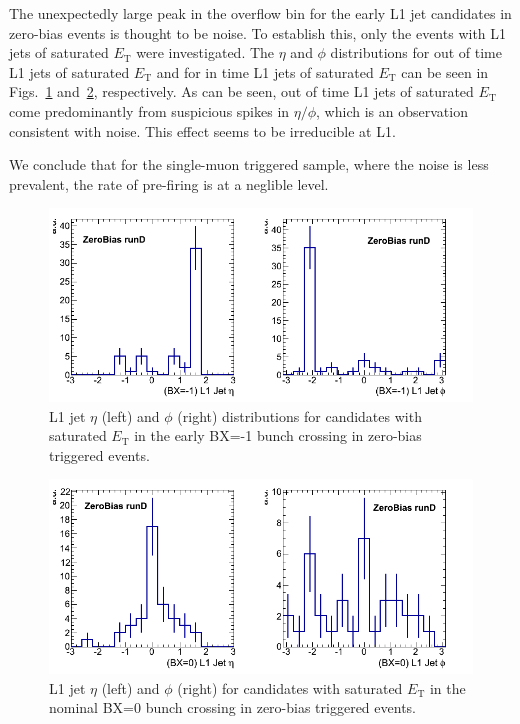 \documentclass[11pt]{cmspaperpdf}
\newcommand{\et}{\ensuremath{E_{\textrm{T}}}\xspace}
\begin{document}
The unexpectedly large peak in the overflow bin for the early L1 jet candidates in zero-bias events is thought to be noise. To establish this, only the events with L1 jets of saturated \et were investigated. The $\eta$ and $\phi$ distributions for out of time L1 jets of saturated \et and for in time L1 jets of saturated \et can be seen in Figs.~\ref{fig:early_eta_phi} and~\ref{fig:central_eta_phi}, respectively. As can be seen, out of time L1 jets of saturated \et come predominantly from suspicious spikes in $\eta/\phi$, which is an observation consistent with noise. This effect seems to be irreducible at L1.

We conclude that for the single-muon triggered sample, where the noise is less prevalent, the rate of pre-firing is at a neglible level.

\begin{figure}
\centering
\includegraphics[scale=0.5]{plots/early_l1Jet_withSaturatedEt_eta_phi_ZeroBias_runD.png}
\caption{L1 jet $\eta$ (left) and $\phi$ (right) distributions for candidates with saturated \et in the early BX=-1 bunch crossing in zero-bias triggered events.}
\label{fig:early_eta_phi} 
\end{figure}
\begin{figure}
\centering
\includegraphics[scale=0.5]{plots/central_l1Jet_withSaturatedEt_eta_phi_ZeroBias_runD.png}
\caption{L1 jet $\eta$ (left) and $\phi$ (right) for candidates with saturated \et in the nominal BX=0 bunch crossing in zero-bias triggered events.} 
\label{fig:central_eta_phi} 
\end{figure}
\end{document}
